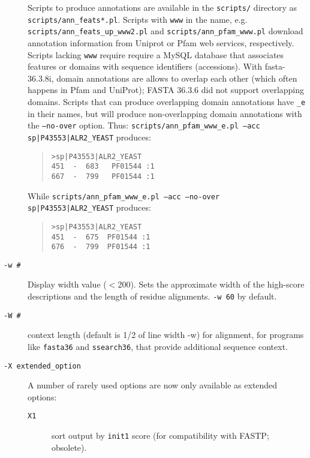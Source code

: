 \documentclass[11pt]{article}
\newcommand{\CURRENT}{fasta-36.3.8i}
\begin{document}
\begin{description}
Scripts to produce annotations are available in the \texttt{scripts/}
directory as \texttt{scripts/ann\_feats*.pl}. Scripts with
\texttt{www} in the name,
e.g. \texttt{scripts/ann\_feats\_up\_www2.pl} and
\texttt{scripts/ann\_pfam\_www.pl} download annotation information
from Uniprot or Pfam web services, respectively.  Scripts lacking
\texttt{www} require require a MySQL database that associates features
or domains with sequence identifiers (accessions).  With \CURRENT,
domain annotations are allows to overlap each other (which often
happens in Pfam and UniProt); FASTA 36.3.6 did not support overlapping
domains.  Scripts that can produce overlapping domain annotations have
\texttt{\_e} in their names, but will produce non-overlapping domain
annotations with the \texttt{--no-over} option. Thus:
\texttt{scripts/ann\_pfam\_www\_e.pl --acc sp|P43553|ALR2\_YEAST}
produces:
\begin{quote}
\begin{verbatim}
>sp|P43553|ALR2_YEAST
451  -  683   PF01544 :1
667  -  799   PF01544 :1
\end{verbatim}
\end{quote}
While \texttt{scripts/ann\_pfam\_www\_e.pl --acc --no-over
  sp|P43553|ALR2\_YEAST} produces:
\begin{quote}
\begin{verbatim}
>sp|P43553|ALR2_YEAST
451  -  675  PF01544 :1
676  -  799  PF01544 :1
\end{verbatim}
\end{quote}

\item[\texttt{-w \#}] 
  Display width value ($<$200). Sets the approximate width of the
  high-score descriptions and the length of residue
  alignments. \texttt{-w 60} by default.

\item[\texttt{-W \#}] context length (default is 1/2 of line width -w)
  for alignment, for programs like \texttt{fasta36} and
  \texttt{ssearch36}, that provide additional sequence context.

\item[\texttt{-X extended\_option}]
A number of rarely used options are now only available as extended options:

\begin{description}

\item[\texttt{X1}] sort output by \texttt{init1} score (for
  compatibility with FASTP; obsolete).


\end{description}
\end{description}
\end{document}
